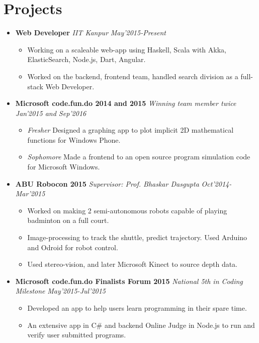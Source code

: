 \documentclass[11pt,a4paper]{moderncv}
\newcommand{\experience}[4]{
\vspace{0.1cm}
\item \textbf{\large{#1}} \emph{#2} \hfill \textit{#3}
  \begin{itemize}[leftmargin=*]
    \setlength\itemsep{0em} #4
  \end{itemize}
}
\newcommand{\onepage}[1]{
\ifdefined\onep
#1
\fi
}
\newcommand{\twopage}[1]{
\ifdefined\twop
#1
\fi
}
\newcommand{\secspace}{
\onepage{\vspace{-0.27cm}}
\twopage{\vspace{-0.1cm}}
}
\newcommand{\secbelow}{
\onepage{\vspace{-0.07cm}}
}
\begin{document}
\secspace
\section*{Projects}
\secbelow
\begin{itemize}
  \twopage{\setlength\itemsep{0.5em}}
\experience{Web Developer}{IIT Kanpur}{May'2015-Present}{
    \item Working on a scaleable web-app using Haskell, Scala with Akka, ElasticSearch, Node.js, Dart, Angular.
    \item Worked on the backend, frontend team, handled search
      division as a full-stack Web Developer.
    }

\experience{Microsoft code.fun.do 2014 and 2015}{Winning team member twice}{Jan'2015 and Sep'2016}{
    \item \textit{Fresher} Designed a graphing app to plot implicit 2D mathematical functions for Windows Phone.
    \item \textit{Sophomore} Made a frontend to an open source program simulation code for Microsoft Windows.
    }

\experience{ABU Robocon 2015}{Supervisor: Prof. Bhaskar Dasgupta}{Oct'2014-Mar'2015}{
    \item Worked on making 2 semi-autonomous robots capable of playing badminton on a full court.
    \item Image-processing to track the shuttle, predict trajectory. Used Arduino and Odroid for robot control.
    \item Used stereo-vision, and later Microsoft Kinect to source depth data.
    }

\experience{Microsoft code.fun.do Finalists Forum 2015}{National 5th in Coding Milestone}{May'2015-Jul'2015}{
    \item Developed an app to help users learn programming in their spare time.
    \item An extensive app in C\# and backend Online Judge in Node.js to run and verify user submitted programs.
    }
    \end{itemize}

\secspace
\end{document}
